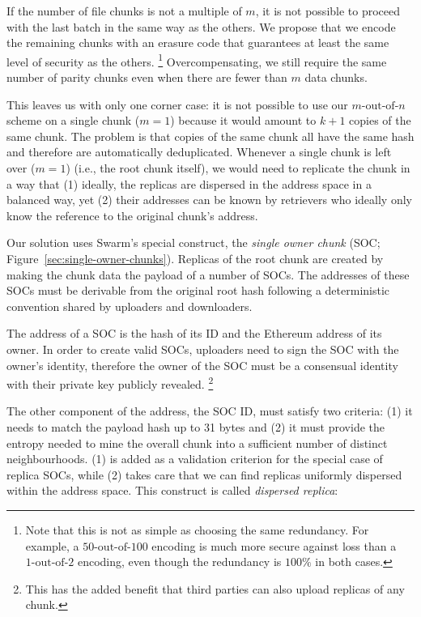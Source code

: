 If the number of file chunks is not a multiple of $m$, it is not possible to proceed with the last batch in the same way as the others. We propose that we encode the remaining chunks with an erasure code that guarantees at least the same level of security as the others.%
%
\footnote{Note that this is not as simple as choosing the same redundancy. For example, a $50\text{-out-of-}100$ encoding is much more secure against loss than a $1\text{-out-of-}2$ encoding, even though the redundancy is $100\%$ in both cases.} 
%
Overcompensating, we still require the same number of parity chunks even when there are fewer than $m$ data chunks.

This leaves us with only one corner case: it is not possible to use our $m\text{-out-of-}n$ scheme on a single chunk ($m=1$) because it would amount to $k+1$ copies of the same chunk. The problem is that copies of the same chunk all have the same hash and therefore are automatically deduplicated. Whenever a single chunk is left over ($m=1$) (i.e., the root chunk itself), we would need to replicate the chunk in a way that (1) ideally, the replicas are dispersed in the address space in a balanced way, yet (2) their addresses can be known by retrievers who ideally only know the reference to the original chunk's address.

 
Our solution uses Swarm's special construct,  the \emph{single owner chunk} (SOC; Figure~\ref{sec:single-owner-chunks}). Replicas of the root chunk are created by making the chunk data the payload of a number of SOCs. The addresses of these SOCs must be derivable from the original root hash following a deterministic convention shared by uploaders and downloaders.

The address of a SOC is the hash of its ID and the Ethereum address of its owner. In order to create valid SOCs, uploaders need to sign the SOC with the owner's identity, therefore the owner of the SOC must be a consensual identity with their private key publicly revealed.
%
\footnote{This has the added benefit that third parties can also upload replicas of any chunk.}

The other component of the address, the SOC ID, must satisfy two criteria: (1) it needs to match the payload hash up to 31 bytes and (2) it must provide the entropy needed to mine the overall chunk into a sufficient number of distinct neighbourhoods. (1) is added as a validation criterion for the special case of replica SOCs, while (2) takes care that we can find replicas uniformly dispersed within the address space.
This construct is called \emph{dispersed replica}:

